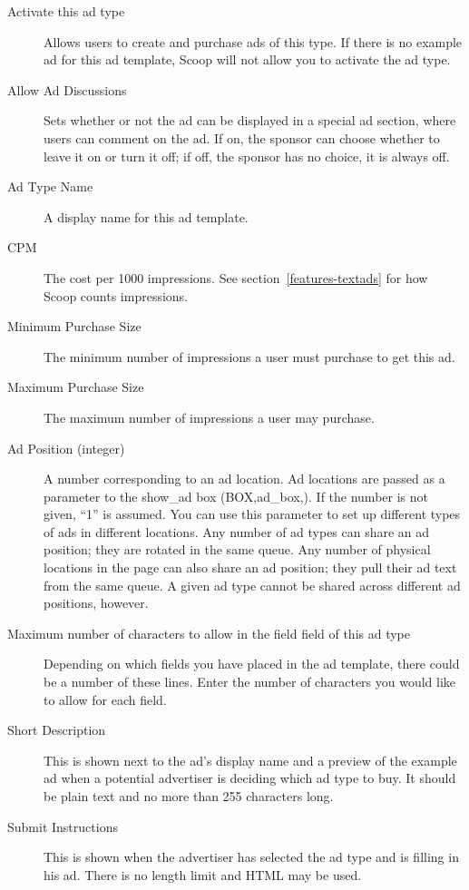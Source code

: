 \begin{description}
\item[Activate this ad type] Allows users to create and purchase ads of this type.  If there is no example ad for this ad template, Scoop will not allow you to activate the ad type.
\item[Allow Ad Discussions] Sets whether or not the ad can be displayed in a special ad section, where users can comment on the ad.  If on, the sponsor can choose whether to leave it on or turn it off; if off, the sponsor has no choice, it is always off.
\item[Ad Type Name] A display name for this ad template.
\item[CPM] The cost per 1000 impressions.  See section~\ref{features-textads} for how Scoop counts impressions.
\item[Minimum Purchase Size] The minimum number of impressions a user must purchase to get this ad.
\item[Maximum Purchase Size] The maximum number of impressions a user may purchase.
\item[Ad Position (integer)] A number corresponding to an ad location.  Ad locations are passed as a parameter to the show\_ad box (\latexhtml{$\vert$}{|}BOX,ad\_box,\latexhtml{$\vert$}{|}).  If the number is not given, ``1'' is assumed.  You can use this parameter to set up different types of ads in different locations.  Any number of ad types can share an ad position; they are rotated in the same queue.  Any number of physical locations in the page can also share an ad position; they pull their ad text from the same queue.  A given ad type cannot be shared across different ad positions, however.
\item[Maximum number of characters to allow in the \latexhtml{$<$}{<}field\latexhtml{$>$}{>} field of this ad type] Depending on which fields you have placed in the ad template, there could be a number of these lines.  Enter the number of characters you would like to allow for each field.
\item[Short Description] This is shown next to the ad's display name and a preview of the example ad when a potential advertiser is deciding which ad type to buy.  It should be plain text and no more than 255 characters long.
\item[Submit Instructions] This is shown when the advertiser has selected the ad type and is filling in his ad.  There is no length limit and HTML may be used.
\end{description}

